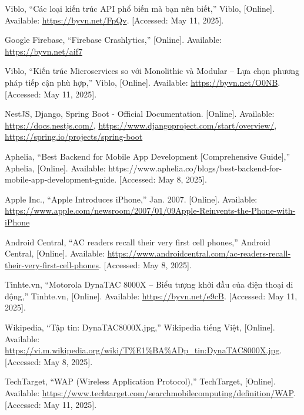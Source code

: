 \documentclass[12pt]{report}
\begin{document}
\begin{thebibliography}{1}



Viblo, “Các loại kiến trúc API phổ biến mà bạn nên biết,” Viblo, [Online]. Available: \url{https://byvn.net/FpQv}. [Accessed: May 11, 2025].

  
  Google Firebase, “Firebase Crashlytics,” [Online]. Available: \url{https://byvn.net/aif7}
  
Viblo, “Kiến trúc Microservices so với Monolithic và Modular – Lựa chọn phương pháp tiếp cận phù hợp,” Viblo, [Online]. Available: \url{https://byvn.net/O0NB}. [Accessed: May 11, 2025].

  
  NestJS, Django, Spring Boot - Official Documentation. [Online]. Available: \url{https://docs.nestjs.com/}, \url{https://www.djangoproject.com/start/overview/}, \url{https://spring.io/projects/spring-boot}

  Aphelia, “Best Backend for Mobile App Development [Comprehensive Guide],” Aphelia, [Online]. Available: https://www.aphelia.co/blogs/best-backend-for-mobile-app-development-guide. [Accessed: May 8, 2025].


  Apple Inc., ``Apple Introduces iPhone,'' Jan. 2007. [Online]. Available: \url{https://www.apple.com/newsroom/2007/01/09Apple-Reinvents-the-Phone-with-iPhone}

  Android Central, “AC readers recall their very first cell phones,” Android Central, [Online]. Available: \url{https://www.androidcentral.com/ac-readers-recall-their-very-first-cell-phones}. [Accessed: May 8, 2025].


  Tinhte.vn, “Motorola DynaTAC 8000X – Biểu tượng khởi đầu của điện thoại di động,” Tinhte.vn, [Online]. Available: \url{https://byvn.net/e9cB}. [Accessed: May 11, 2025].


  Wikipedia, “Tập tin: DynaTAC8000X.jpg,” Wikipedia tiếng Việt, [Online]. Available: \url{https://vi.m.wikipedia.org/wiki/T%E1%BA%ADp_tin:DynaTAC8000X.jpg}. [Accessed: May 8, 2025].

  TechTarget, “WAP (Wireless Application Protocol),” TechTarget, [Online]. Available: \url{https://www.techtarget.com/searchmobilecomputing/definition/WAP}. [Accessed: May 11, 2025].



\end{thebibliography}
\end{document}
